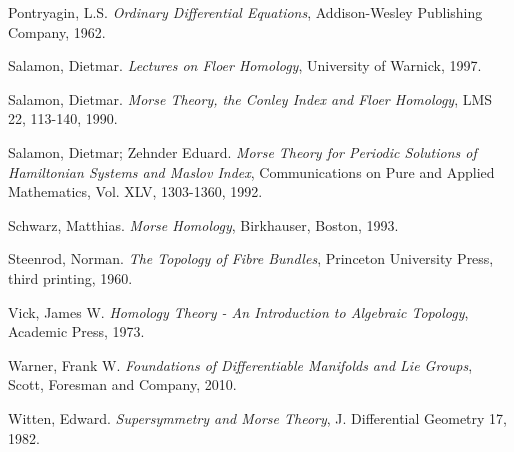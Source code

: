 \documentclass[12pt]{book}
\begin{document}
\begin{thebibliography}{9}
		Pontryagin, L.S.
		\emph{Ordinary Differential Equations},
		Addison-Wesley Publishing Company,
		1962.
		
		Salamon, Dietmar.
		\emph{Lectures on Floer Homology},
		University of Warnick,
		1997.


		Salamon, Dietmar.
		\emph{Morse Theory, the Conley Index and Floer Homology},
		LMS 22, 113-140,
		1990.

		Salamon, Dietmar; Zehnder Eduard.
		\emph{Morse Theory for Periodic Solutions of Hamiltonian Systems and Maslov Index},
		Communications on Pure and Applied Mathematics, Vol. XLV, 1303-1360,
		1992.
		
		Schwarz, Matthias.
		\emph{Morse Homology},
		Birkhauser, Boston,
		1993.
		
		Steenrod, Norman.
		\emph{The Topology of Fibre Bundles},
		Princeton University Press, third printing, 
		1960.
		
		Vick, James W.
		\emph{Homology Theory - An Introduction to Algebraic Topology},
		Academic Press, 1973.
		
		Warner, Frank W.
		\emph{Foundations of Differentiable Manifolds and Lie Groups},
		Scott, Foresman and Company, 2010.
			
		Witten, Edward.
		\emph{Supersymmetry and Morse Theory},
		J. Differential Geometry 17,
		1982.
	\end{thebibliography}
	
\end{document}
